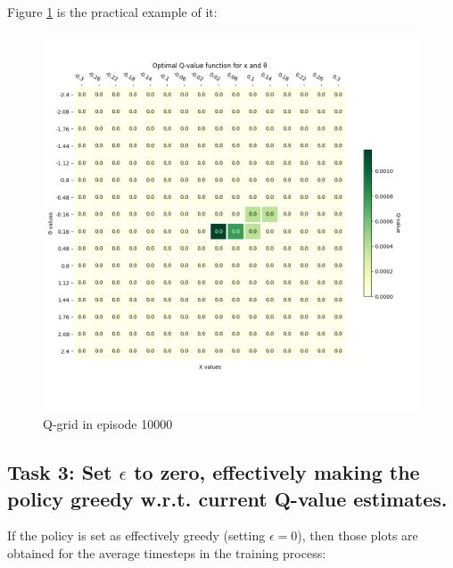 \documentclass[12pt]{article}
\begin{document}
Figure \ref{fig:q-1-3} is the practical example of it:

\begin{figure}[h]
    \centering
    \includegraphics[scale=0.25]{exercise-3/plots/heatmap-fixed-0.2-ep-1.png}
    \caption{Q-grid in episode 10000}
    \label{fig:q-1-3}
\end{figure}

\subsection{Task 3: Set $\epsilon$ to zero, effectively making the policy greedy w.r.t. current Q-value estimates.}

If the policy is set as effectively greedy (setting $\epsilon = 0$), then those plots are obtained for the average timesteps in the training process:
\end{document}
